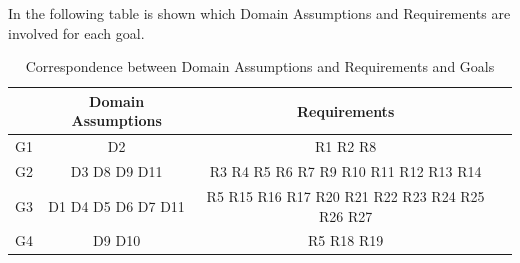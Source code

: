 \documentclass[a4paper]{report}
\begin{document}
In the following table is shown which Domain Assumptions and Requirements are involved for each goal.
\begin{table}[H]
  \centering
  \begin{tabular}{|c|c|c|c|}
    \cline{2-3}
    \multicolumn{1}{c|}{} & Domain Assumptions  & Requirements \\ \hline
    G1 & D2 & R1 R2 R8\\ \hline
    G2 & D3 D8 D9 D11 & R3 R4 R5 R6 R7 R9 R10 R11 R12 R13 R14\\ \hline
    G3 & D1 D4 D5 D6 D7 D11 & R5 R15 R16 R17 R20 R21 R22 R23 R24 R25 R26 R27\\ \hline
    G4 & D9 D10 & R5 R18 R19 \\ \hline
  \end{tabular}
  \caption{Correspondence between Domain Assumptions and Requirements and Goals}
\end{table}
\end{document}

